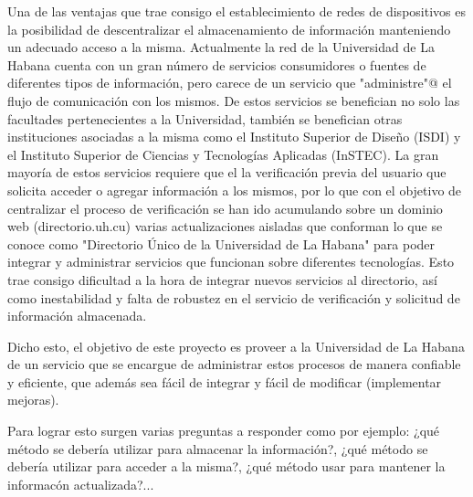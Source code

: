 \begin{introduction}
Una de las ventajas que trae consigo el establecimiento de redes de dispositivos es la posibilidad de descentralizar el almacenamiento de información  manteniendo un adecuado acceso a la misma. Actualmente la red de la Universidad de La Habana cuenta con un gran número de servicios consumidores o fuentes de diferentes tipos de información, pero carece de un servicio que \verb@"administre"@ el flujo de comunicación con los mismos. De estos servicios se benefician no solo las facultades pertenecientes a la Universidad, también se benefician otras instituciones asociadas a la misma como  el Instituto Superior de Diseño (ISDI) y el Instituto Superior de Ciencias y Tecnologías Aplicadas (InSTEC). La gran mayoría  de estos servicios requiere que el la verificación previa del usuario que solicita acceder o  agregar información a los mismos, por lo que con el objetivo de centralizar el proceso de verificación se han ido acumulando sobre un dominio web (directorio.uh.cu) varias actualizaciones  aisladas que conforman lo que se conoce como "Directorio Único de la Universidad de La Habana" para poder integrar y administrar servicios que funcionan sobre diferentes tecnologías.  Esto  trae consigo dificultad a la hora de integrar nuevos servicios al directorio, así como inestabilidad y falta de robustez en el servicio de verificación y solicitud de información almacenada.




Dicho esto, el objetivo de este proyecto es proveer a la Universidad de La Habana de un servicio que se encargue de administrar estos procesos de manera confiable y eficiente,
que además sea fácil de integrar y fácil de modificar (implementar mejoras).

Para lograr esto surgen varias preguntas a responder como por ejemplo: ¿qué método 
se debería utilizar para almacenar la información?, ¿qué método se debería utilizar 
para acceder a la misma?, ¿qué método usar para mantener la informacón actualizada?... 


\end{introduction}
